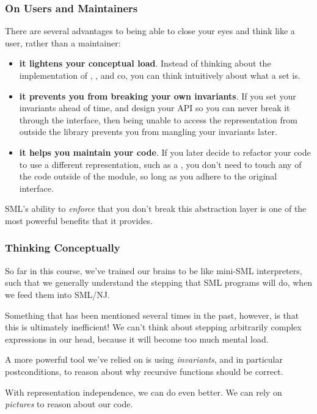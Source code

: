 \documentclass[aspectratio=169, handout]{beamer}
\begin{document}
\begin{frame}[fragile]
  \frametitle{On Users and Maintainers}

  There are several advantages to being able to close your eyes and think like a
  user, rather than a maintainer:

  \pause
  \begin{itemize}
    \item \textbf{it lightens your conceptual load}. Instead of thinking about the implementation
    of , , and co, you can think intuitively about what
    a set is. \pause
    \item \textbf{it prevents you from breaking your own invariants}. If you set your invariants
    ahead of time, and design your API so you can never break it through the interface,
    then being unable to access the representation from outside the library prevents
    you from mangling your invariants later. \pause
    \item \textbf{it helps you maintain your code}. If you later decide to refactor your code
    to use a different representation, such as a , you don't need to
    touch any of the code outside of the module, so long as you adhere to the
    original interface.
  \end{itemize}

  \pause
  \vspace{\fill}

  SML's ability to \textit{enforce} that you don't break this abstraction layer
  is one of the most powerful benefits that it provides.
\end{frame}


\begin{frame}[fragile]
  \frametitle{Thinking Conceptually}

  So far in this course, we've trained our brains to be like mini-SML interpreters,
  such that we generally understand the stepping that SML programs will do, when we
  feed them into SML/NJ.

  \pause
  \vspace{\fill}

  Something that has been mentioned several times in the past, however, is that
  this is ultimately inefficient! We can't think about stepping arbitrarily complex
  expressions in our head, because it will become too much mental load.

  \pause
  \vspace{\fill}

  A more powerful tool we've relied on is using \textit{invariants}, and in particular
   postconditions, to reason about why recursive functions should be
  correct.

  \pause
  \vspace{\fill}

  With representation independence, we can do even better. We can rely on \textit{pictures}
  to reason about our code.
\end{frame}
\end{document}
